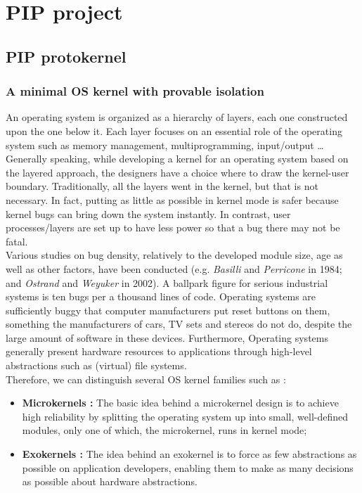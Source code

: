 \chapter{PIP project}

\section{PIP protokernel}

\subsection{A minimal OS kernel with provable isolation} \label{PIP}
An operating system is organized as a hierarchy  of layers, each one constructed  upon  the one  below  it. Each layer focuses on an essential role of the operating system such as memory management, multiprogramming, input/output \dots Generally speaking, while developing a kernel for an operating system based on the layered  approach,  the designers have a choice where to draw the kernel-user boundary. Traditionally, all the layers went in the kernel, but that is not necessary. In fact, putting as little as possible in kernel mode is safer because kernel bugs can bring down the system instantly. In contrast, user processes/layers are set up to have less power so that a bug there may not be fatal.\\

Various studies on bug density, relatively to the developed module size, age as well as other factors, have been conducted (e.g.  \textit{Basilli}  and  \textit{Perricone} in 1984;  and \textit{Ostrand}  and  \textit{Weyuker} in 2002). A  ballpark  figure  for  serious industrial systems is ten  bugs per a thousand  lines  of code. Operating  systems  are  sufficiently  buggy  that  computer  manufacturers  put  reset  buttons  on  them, something  the  manufacturers of cars, TV sets and stereos do  not do,  despite  the  large  amount  of software in these devices. Furthermore, Operating systems generally present hardware resources to applications through high-level abstractions such as (virtual) file systems.\\

\noindent Therefore, we can distinguish several OS kernel families such as : 
\begin{itemize}
	\item \textbf{Microkernels :} The basic idea  behind a microkernel design  is  to  achieve  high reliability  by  splitting  the  operating  system  up  into  small,  well-defined  modules,  only  one  of  which, the  microkernel, runs  in  kernel  mode;
	\item \textbf{Exokernels :} The idea behind an exokernel is to force as few abstractions as possible on application developers, enabling them to make as many decisions as possible about hardware abstractions.
\end{itemize} 
  
